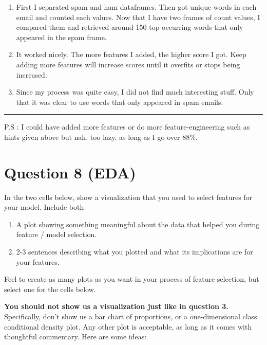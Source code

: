 \documentclass[11pt]{article}
\providecommand{\tightlist}{%
      \setlength{\itemsep}{0pt}\setlength{\parskip}{0pt}}
\begin{document}
    \begin{enumerate}
\def\labelenumi{\arabic{enumi}.}
\tightlist
\item
  First I separated spam and ham dataframes. Then got unique words in
  each email and counted each values. Now that I have two frames of
  count values, I compared them and retrieved around 150 top-occurring
  words that only appeared in the spam frame.
\item
  It worked nicely. The more features I added, the higher score I got.
  Keep adding more features will increase scores until it overfits or
  stops being increased.
\item
  Since my process was quite easy, I did not find much interesting
  stuff. Only that it was clear to use words that only appeared in spam
  emails.
\end{enumerate}

\begin{center}\rule{0.5\linewidth}{\linethickness}\end{center}

P.S : I could have added more features or do more feature-engineering
such as hints given above but nah. too lazy. as long as I go over 88\%.

    \section{Question 8 (EDA)}\label{question-8-eda}

In the two cells below, show a visualization that you used to select
features for your model. Include both

\begin{enumerate}
\def\labelenumi{\arabic{enumi}.}
\tightlist
\item
  A plot showing something meaningful about the data that helped you
  during feature / model selection.
\item
  2-3 sentences describing what you plotted and what its implications
  are for your features.
\end{enumerate}

Feel to create as many plots as you want in your process of feature
selection, but select one for the cells below.

\textbf{You should not show us a visualization just like in question 3.}
Specifically, don't show us a bar chart of proportions, or a
one-dimensional class conditional density plot. Any other plot is
acceptable, as long as it comes with thoughtful commentary. Here are
some ideas:
\end{document}
